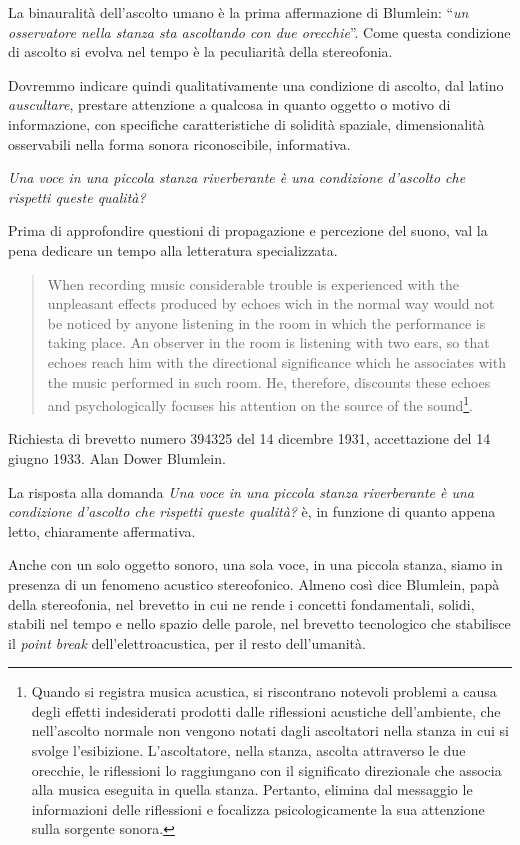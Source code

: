 La binauralità dell'ascolto umano è la prima affermazione di Blumlein:
“\emph{un osservatore nella stanza sta ascoltando con due orecchie}”. Come
questa condizione di ascolto si evolva nel tempo è la peculiarità della
stereofonia.


Dovremmo indicare quindi qualitativamente una condizione di ascolto, dal latino
\emph{auscultare}, prestare attenzione a qualcosa in quanto oggetto o motivo di informazione, con specifiche caratteristiche di solidità spaziale, dimensionalità osservabili nella forma sonora riconoscibile, informativa.

\emph{Una voce in una piccola stanza riverberante è una condizione d'ascolto che
rispetti queste qualità?}

Prima di approfondire questioni di propagazione e percezione del suono, val la pena
dedicare un tempo alla letteratura specializzata.

\begin{quote}
When recording music considerable trouble is experienced with the unpleasant
effects produced by echoes wich in the normal way would not be noticed by anyone
listening in the room in which the performance is taking place. An observer in
the room is listening with two ears, so that echoes reach him with the directional
significance which he associates with the music performed in such room. He,
therefore, discounts these echoes and psychologically focuses his attention on
the source of the sound\footnote{Quando si registra musica acustica, si riscontrano
notevoli problemi a causa degli effetti indesiderati prodotti dalle riflessioni
acustiche dell'ambiente, che nell'ascolto normale non vengono notati dagli
ascoltatori nella stanza in cui si svolge l'esibizione. L'ascoltatore, nella stanza,
ascolta attraverso le due orecchie, le riflessioni lo raggiungano con il significato direzionale che associa alla musica eseguita in quella stanza.
Pertanto, elimina dal messaggio le informazioni delle riflessioni e focalizza
psicologicamente la sua attenzione sulla sorgente sonora.}.
\end{quote}

Richiesta di brevetto numero 394325 del 14 dicembre 1931, accettazione del 14
giugno 1933. Alan Dower Blumlein.

La risposta alla domanda \emph{Una voce in una piccola stanza riverberante è una
condizione d'ascolto che rispetti queste qualità?} è, in funzione di quanto
appena letto, chiaramente affermativa.

Anche con un solo oggetto sonoro, una sola voce, in una piccola stanza, siamo in
presenza di un fenomeno acustico stereofonico. Almeno così dice Blumlein, papà
della stereofonia, nel brevetto in cui ne rende i concetti fondamentali, solidi,
stabili nel tempo e nello spazio delle parole, nel brevetto tecnologico che stabilisce
il \emph{point break} dell'elettroacustica, per il resto dell'umanità.
